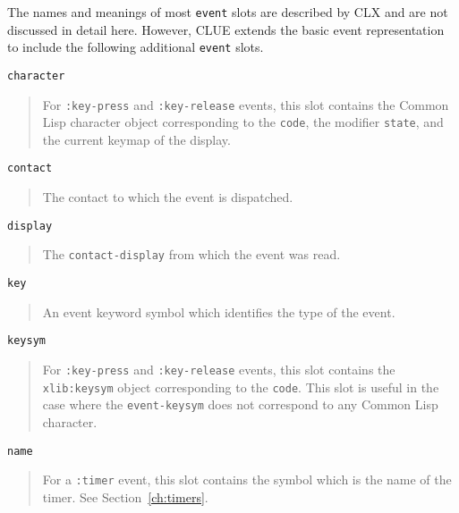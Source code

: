 The names and meanings of most {\tt event} slots are described by CLX\cite{clx}
and are not discussed in detail here. However, CLUE extends the basic event
representation to include the following  additional {\tt event} slots.

\begin{flushright} \parbox[t]{6.125in}{
{\tt character}
\begin{quote}
For {\tt :key-press} and {\tt :key-release} events, this slot contains the Common
Lisp character
object corresponding to the {\tt code}, the modifier {\tt state}, and the
current keymap of the display.
\end{quote}

}\end{flushright}

\begin{flushright} \parbox[t]{6.125in}{
{\tt contact}
\begin{quote}
The contact to which the event is dispatched.
\end{quote}

}\end{flushright}
\begin{flushright} \parbox[t]{6.125in}{
{\tt display}
\begin{quote}
The {\tt contact-display} from which the event was read.
\end{quote}

}\end{flushright}
\begin{flushright} \parbox[t]{6.125in}{
{\tt key}
\begin{quote}
An event keyword symbol which identifies the type of the event.
\end{quote}

}\end{flushright}
\begin{flushright} \parbox[t]{6.125in}{
{\tt keysym}
\begin{quote}
For {\tt :key-press} and {\tt :key-release} events, this slot contains the {\tt
xlib:keysym}
object corresponding to the {\tt code}. This slot is useful in the case where
the {\tt event-keysym} does not correspond to any Common Lisp character.
\end{quote}

}\end{flushright}
\begin{flushright} \parbox[t]{6.125in}{
{\tt name}
\begin{quote}
For a {\tt :timer} event, this slot contains the symbol which is the name of the
timer.  See Section~\ref{ch:timers}.
\end{quote}

}\end{flushright}


